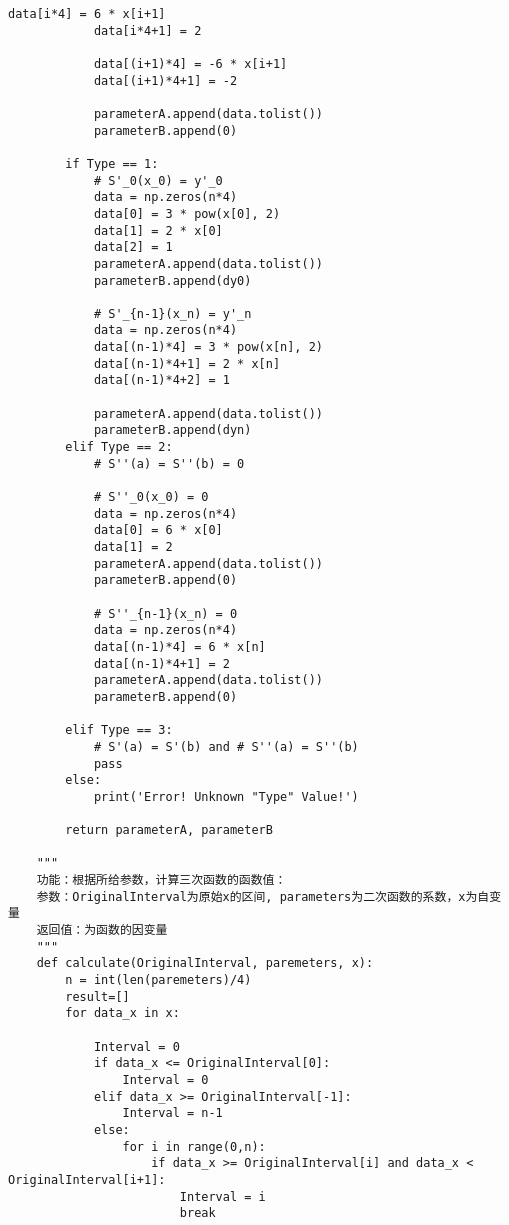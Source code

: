 \begin{lstlisting}[style = python]
            data[i*4] = 6 * x[i+1]
            data[i*4+1] = 2
    
            data[(i+1)*4] = -6 * x[i+1]
            data[(i+1)*4+1] = -2
            
            parameterA.append(data.tolist())
            parameterB.append(0)
    
        if Type == 1:
            # S'_0(x_0) = y'_0
            data = np.zeros(n*4)
            data[0] = 3 * pow(x[0], 2)
            data[1] = 2 * x[0]
            data[2] = 1
            parameterA.append(data.tolist())
            parameterB.append(dy0)
    
            # S'_{n-1}(x_n) = y'_n
            data = np.zeros(n*4)
            data[(n-1)*4] = 3 * pow(x[n], 2)
            data[(n-1)*4+1] = 2 * x[n]
            data[(n-1)*4+2] = 1
    
            parameterA.append(data.tolist())
            parameterB.append(dyn)
        elif Type == 2:
            # S''(a) = S''(b) = 0
    
            # S''_0(x_0) = 0
            data = np.zeros(n*4)
            data[0] = 6 * x[0]
            data[1] = 2
            parameterA.append(data.tolist())
            parameterB.append(0)
    
            # S''_{n-1}(x_n) = 0
            data = np.zeros(n*4)
            data[(n-1)*4] = 6 * x[n]
            data[(n-1)*4+1] = 2
            parameterA.append(data.tolist())
            parameterB.append(0)
    
        elif Type == 3:
            # S'(a) = S'(b) and # S''(a) = S''(b)
            pass
        else:
            print('Error! Unknown "Type" Value!')
    
        return parameterA, parameterB
    
    """
    功能：根据所给参数，计算三次函数的函数值：
    参数：OriginalInterval为原始x的区间, parameters为二次函数的系数，x为自变量
    返回值：为函数的因变量
    """
    def calculate(OriginalInterval, paremeters, x):
        n = int(len(paremeters)/4)
        result=[]
        for data_x in x:
    
            Interval = 0
            if data_x <= OriginalInterval[0]:
                Interval = 0
            elif data_x >= OriginalInterval[-1]:
                Interval = n-1
            else:
                for i in range(0,n):
                    if data_x >= OriginalInterval[i] and data_x < OriginalInterval[i+1]:
                        Interval = i
                        break
    

\end{lstlisting}
